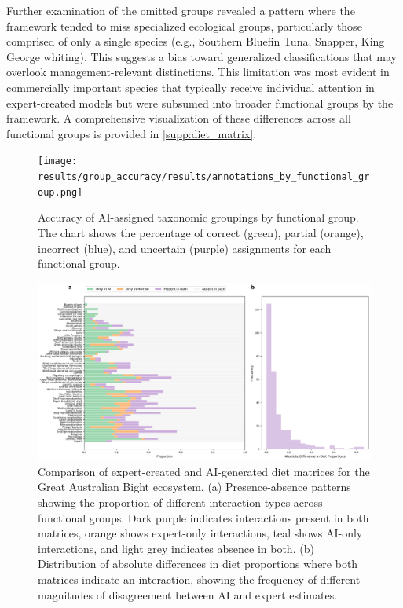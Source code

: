 Further examination of the omitted groups revealed a pattern where the framework tended to miss specialized ecological groups, particularly those comprised of only a single species (e.g., Southern Bluefin Tuna, Snapper, King George whiting). This suggests a bias toward generalized classifications that may overlook management-relevant distinctions. This limitation was most evident in commercially important species that typically receive individual attention in expert-created models but were subsumed into broader functional groups by the framework. A comprehensive visualization of these differences across all functional groups is provided in \ref{supp:diet_matrix}.

\begin{figure}[htbp]
    \centering
    \texttt{[image: results/group\_accuracy/results/annotations\_by\_functional\_group.png]}
    \caption{Accuracy of AI-assigned taxonomic groupings by functional group. The chart shows the percentage of correct (green), partial (orange), incorrect (blue), and uncertain (purple) assignments for each functional group.}
    \label{fig:annotations_by_functional_group}
\end{figure}

\begin{landscape}
\begin{figure}[htbp]
    \centering
    \includegraphics[width=1.2\paperwidth]{figures/diet_matrix_validation/simplified_comparison.png}
    \caption{Comparison of expert-created and AI-generated diet matrices for the Great Australian Bight ecosystem. (a) Presence-absence patterns showing the proportion of different interaction types across functional groups. Dark purple indicates interactions present in both matrices, orange shows expert-only interactions, teal shows AI-only interactions, and light grey indicates absence in both. (b) Distribution of absolute differences in diet proportions where both matrices indicate an interaction, showing the frequency of different magnitudes of disagreement between AI and expert estimates.}
    \label{fig:gab_comparison}
\end{figure}
\end{landscape}

